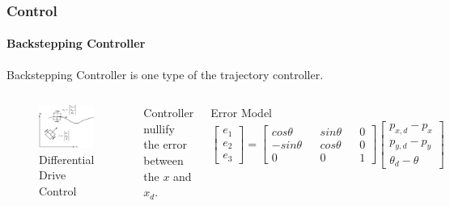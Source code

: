 \begin{frame}
	\frametitle{Control}
	\framesubtitle{Backstepping Controller}
	Backstepping Controller is one type of the trajectory controller.
	\begin{columns}
		\begin{figure}
			\caption{Differential Drive Control}
			\includegraphics[scale=0.5]{image/cont.pdf}
		\end{figure}
		Controller nullify the error between the \(x\) and \(x_d\).
		\begin{block}{Error Model}
			\begin{equation}
				\begin{bmatrix}
					e_1\\
					e_2\\
					e_3
				\end{bmatrix}=\begin{bmatrix}
				cos\theta && sin\theta && 0\\
				-sin\theta && cos\theta && 0\\
				0 && 0 && 1
			\end{bmatrix}
			\begin{bmatrix}
				p_{x,d} - p_x\\
				p_{y,d} - p_y\\
				\theta_d - \theta
			\end{bmatrix}
			\end{equation}
		\end{block}
	\end{columns}
\end{frame}


